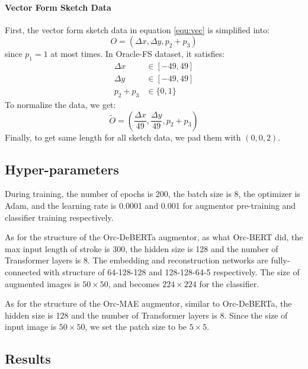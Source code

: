 \documentclass{article}
\begin{document}
\paragraph{Vector Form Sketch Data}
First, the vector form sketch data in equation \ref{equ:vec} is simplified into:
\begin{equation*}
	O = (\Delta x, \Delta y, p_2 + p_3) 
\end{equation*} 
since $ p_1 = 1 $ at most times.
In Oracle-FS dataset, it satisfies:
\begin{align*}
	\Delta x &\in [-49, 49] \\
	\Delta y &\in [-49, 49] \\
	p_2 + p_3 &\in \{0, 1\}
\end{align*}
To normalize the data, we get:
\begin{equation*}
	\tilde{O} = 
	(\frac{\Delta x}{49}, \frac{\Delta y}{49},	p_2 + p_3) 
\end{equation*} 
Finally, to get same length for all sketch data, we pad them with $(0, 0, 2)$.

\subsection{Hyper-parameters}

During training, the number of epochs is 200, the batch size is 8, the optimizer is Adam, and the learning rate is 0.0001 and 0.001 for augmentor pre-training and classifier training respectively.

As for the structure of the Orc-DeBERTa augmentor, as what Orc-BERT did, the max input length of stroke is 300, the hidden size is 128 and the number of Transformer layers is 8. The embedding and reconstruction networks are fully-connected with structure of 64-128-128 and 128-128-64-5 respectively. The size of augmented images is $ 50 \times 50 $, and becomes $ 224 \times 224 $ for the classifier.

As for the structure of the Orc-MAE augmentor, similar to Orc-DeBERTa, the hidden size is 128 and the number of Transformer layers is 8. Since the size of input image is $ 50 \times 50 $, we set the patch size to be $ 5 \times 5 $.


\subsection{Results}
\end{document}
